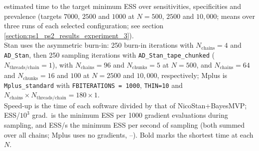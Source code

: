 \begin{table}[H]
{{estimated time to the target minimum ESS over sensitivities, specificities and prevalence
(targets $7000$, $2500$ and $1000$ at $N = 500$, $2500$ and $10,000$;
means over three runs of each selected configuration; see section \ref{section:ps1_ps2_results_experiment_3}). \\
Stan uses the asymmetric burn-in: 250 burn-in iterations with $N_{\text{chains}} = 4$ and \texttt{AD\_Stan},
then 250 sampling iterations with \texttt{AD\_Stan\_tape\_chunked} ($N_{\text{threads/chain}} = 1$),
with $N_{\text{chains}} = 96$ and $N_{\text{chunks}} = 5$ at $N=500$,
and $N_{\text{chains}} = 64$ and $N_{\text{chunks}} = 16$ and $100$ at $N=2500$ and $10,000$, respectively;
Mplus is \texttt{Mplus\_\ab standard} with \texttt{FBITERATIONS = 1000}, \texttt{THIN{=}10}
and $N_{\text{chains}} \times N_{\text{threads/chain}} = 180 \times 1$. \\
Speed-up is the time of each software divided by that of NicoStan+BayesMVP;
ESS/$10^3$ grad.\ is the minimum ESS per 1000 gradient evaluations during sampling,
and ESS/s the minimum ESS per second of sampling (both summed over all chains; Mplus uses no gradients, --).
Bold marks the shortest time at each $N$.
}}
\label{S:table:exp3_absolute_efficiency_hpc}
\PaperOneFitTable{
}
\end{table}

